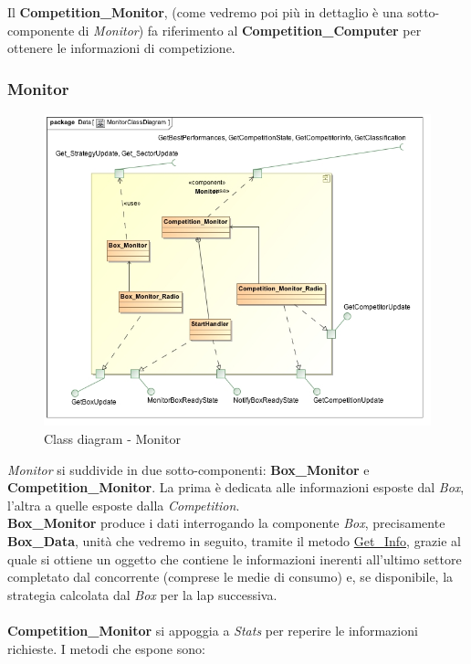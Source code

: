Il \textbf{Competition\_Monitor}, (come vedremo poi pi\`{u} in dettaglio \`{e} una sotto-componente di \emph{Monitor}) fa riferimento al \textbf{Competition\_Computer} per 
ottenere le informazioni di competizione.
\newpage
\subsubsection{Monitor}
\begin{center}
\begin{figure}[h!]
	\includegraphics[scale=0.50]{img/ClassDiagrams/MonitorClassDiagram.jpg}
\caption{Class diagram - Monitor}
\end{figure}
\end{center}
\emph{Monitor} si suddivide in due sotto-componenti: \textbf{Box\_Monitor} e \textbf{Competition\_Monitor}. La prima \`{e} dedicata alle informazioni
esposte dal \emph{Box}, l'altra a quelle esposte dalla \emph{Competition}.\\
\textbf{Box\_Monitor} produce i dati interrogando la componente \emph{Box}, precisamente \textbf{Box\_Data}, unit\`{a} che vedremo in seguito,
tramite il metodo \underline{Get\_Info}, grazie al quale si ottiene un oggetto che contiene le informazioni inerenti all'ultimo settore
completato dal concorrente (comprese le medie di consumo) e, se disponibile, la strategia calcolata dal \emph{Box} per la lap successiva.\\\\
\textbf{Competition\_Monitor} si appoggia a \emph{Stats} per reperire le informazioni richieste. I metodi che espone sono:
